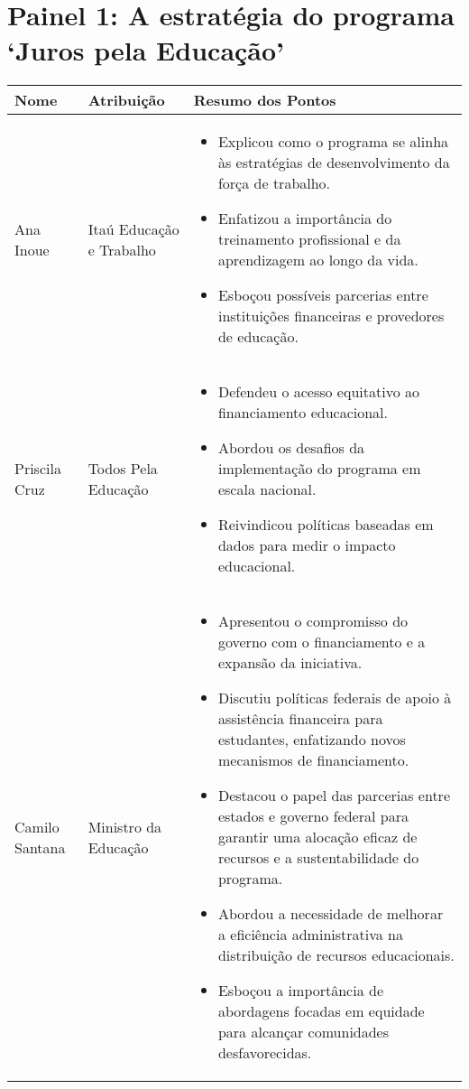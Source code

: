 \documentclass[a4paper,10pt]{article}
\begin{document}
\section*{Painel 1: A estratégia do programa `Juros pela Educação'}

\begin{table}[htbp!]
	\centering
	\renewcommand{\arraystretch}{1.2}
	\begin{tabular}{|p{1in}|p{1.4in}|p{4in}|}
		\hline
		Nome & Atribuição & Resumo dos Pontos \\
		\hline
		Ana Inoue & Itaú Educação e Trabalho & \begin{itemize}
			\item Explicou como o programa se alinha às estratégias de desenvolvimento da força de trabalho.
			\item Enfatizou a importância do treinamento profissional e da aprendizagem ao longo da vida.
			\item Esboçou possíveis parcerias entre instituições financeiras e provedores de educação.
		\end{itemize}\\
		\hline
		Priscila Cruz & Todos Pela Educação & \begin{itemize}
			\item Defendeu o acesso equitativo ao financiamento educacional.
			\item Abordou os desafios da implementação do programa em escala nacional.
			\item Reivindicou políticas baseadas em dados para medir o impacto educacional.
		\end{itemize}\\
		\hline
		Camilo Santana & Ministro da Educação & \begin{itemize}
			\item Apresentou o compromisso do governo com o financiamento e a expansão da iniciativa.
			\item Discutiu políticas federais de apoio à assistência financeira para estudantes, enfatizando novos mecanismos de financiamento.
			\item Destacou o papel das parcerias entre estados e governo federal para garantir uma alocação eficaz de recursos e a sustentabilidade do programa.
			\item Abordou a necessidade de melhorar a eficiência administrativa na distribuição de recursos educacionais.
			\item Esboçou a importância de abordagens focadas em equidade para alcançar comunidades desfavorecidas.

\end{itemize}
\end{tabular}
\end{table}
\end{document}
